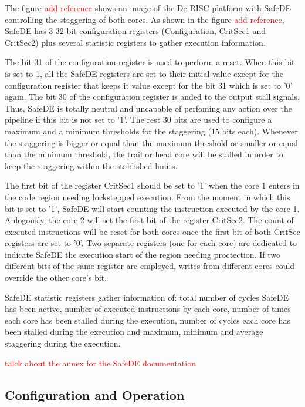 The figure \textcolor{red}{add reference} shows an image of the De-RISC platform with SafeDE controlling the staggering of both cores. As shown in the figure \textcolor{red}{add reference}, SafeDE has 3 32-bit configuration registers (Configuration, CritSec1 and CritSec2) plus several statistic registers to gather execution information.

The bit 31 of the configuration register is used to perform a reset. When this bit is set to 1, all the SafeDE registers are set to their initial value except for the configuration register that keeps it value except for the bit 31 which is set to '0' again. The bit 30 of the configuration register is anded to the output stall signals. Thus, SafeDE is totally neutral and uncapable of perfoming any action over the pipeline if this bit is not set to '1'. The rest 30 bits are used to configure a maximum and a minimum thresholds for the staggering (15 bits each). Whenever the staggering is bigger or equal than the maximum threshold or smaller or equal than the minimum threshold, the trail or head core will be stalled in order to keep the staggering within the stablished limits.  

The first bit of the register CritSec1 should be set to '1' when the core 1 enters in the code region needing lockstepped execution.  From the moment in which this bit is set to '1', SafeDE will start counting the instruction executed by the core 1. Anlogously, the core 2 will set the first bit of the register CritSec2. The count of executed instructions will be reset for both cores once the first bit of both CritSec registers are set to '0'. Two separate registers (one for each core) are dedicated to indicate SafeDE the execution start of the region needing proctection. If two different bits of the same register are employed, writes from different cores could override the other core's bit.

SafeDE statistic registers gather information of: total number of cycles SafeDE has been active, number of executed instructions by each core, number of times each core has been stalled during the execution, number of cycles each core has been stalled during the execution and maximum, minimum and average staggering during the execution.


\textcolor{red}{talck about the annex for the SafeDE documentation}

\subsection{Configuration and Operation}

